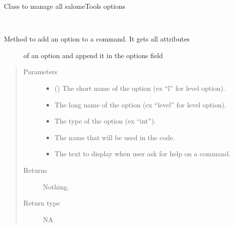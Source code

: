 \documentclass[a4paper,10pt,english]{sphinxmanual}
\begin{document}
\begin{fulllineitems}
\label{\detokenize{commands/apidoc/src:src.options.Options}}
Class to manage all salomeTools options

\begin{fulllineitems}
\label{\detokenize{commands/apidoc/src:src.options.Options.add_option}}~\begin{description}
\item[{Method to add an option to a command. It gets all attributes}] \leavevmode
of an option and append it in the options field

\end{description}
\begin{quote}\begin{description}
\item[{Parameters}] \leavevmode\begin{itemize}
\item {} 
 () \textendash{} The short name of the option
(ex “l” for level option).

\item {} 
 \textendash{} The long name of the option 
(ex “level” for level option).

\item {} 
 \textendash{} The type of the option (ex “int”).

\item {} 
 \textendash{} The name that will be used in the code.

\item {} 
 \textendash{} The text to display 
when user ask for help on a command.

\end{itemize}

\item[{Returns}] \leavevmode
Nothing.

\item[{Return type}] \leavevmode
NA


\end{description}
\end{quote}
\end{fulllineitems}
\end{fulllineitems}
\end{document}
